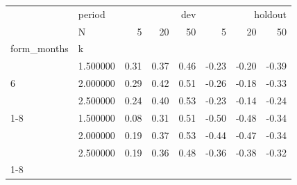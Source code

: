 \begin{tabular}{llrrrrrr}
\toprule
 & period & \multicolumn{3}{r}{dev} & \multicolumn{3}{r}{holdout} \\
 & N & 5 & 20 & 50 & 5 & 20 & 50 \\
form_months & k &  &  &  &  &  &  \\
\midrule
\multirow[t]{3}{*}{6} & 1.500000 & 0.31 & 0.37 & 0.46 & -0.23 & -0.20 & -0.39 \\
 & 2.000000 & 0.29 & 0.42 & 0.51 & -0.26 & -0.18 & -0.33 \\
 & 2.500000 & 0.24 & 0.40 & 0.53 & -0.23 & -0.14 & -0.24 \\
\cline{1-8}
\multirow[t]{3}{*}{12} & 1.500000 & 0.08 & 0.31 & 0.51 & -0.50 & -0.48 & -0.34 \\
 & 2.000000 & 0.19 & 0.37 & 0.53 & -0.44 & -0.47 & -0.34 \\
 & 2.500000 & 0.19 & 0.36 & 0.48 & -0.36 & -0.38 & -0.32 \\
\cline{1-8}
\bottomrule
\end{tabular}
